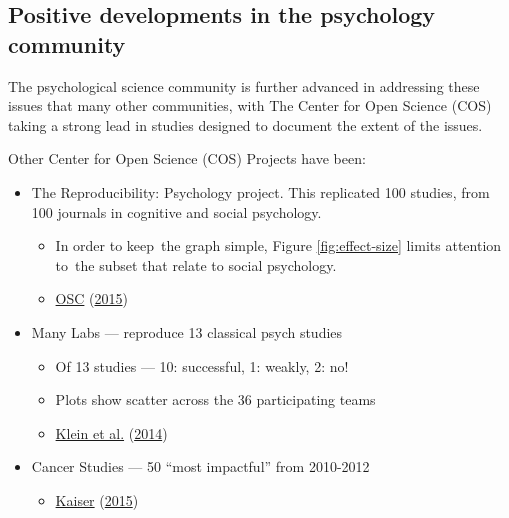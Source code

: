 \documentclass[
  10pt,
  b5paper]{book}
\providecommand{\tightlist}{%
  \setlength{\itemsep}{0pt}\setlength{\parskip}{0pt}}
\begin{document}
\hypertarget{positive-developments-in-the-psychology-community}{%
\subsection*{Positive developments in the psychology community}\label{positive-developments-in-the-psychology-community}}

The psychological science community is further advanced in
addressing these issues that many other communities, with
The Center for Open Science (COS) taking a strong lead in
studies designed to document the extent of the issues.

Other Center for Open Science (COS) Projects have been:

\begin{itemize}
\tightlist
\item
  The Reproducibility: Psychology project. This replicated
  100 studies, from 100 journals in cognitive and social
  psychology.

  \begin{itemize}
  \tightlist
  \item
    In order to keep~the graph simple, Figure
    \ref{fig:effect-size} limits attention to~the
    subset that relate to social psychology.
  \item
    \protect\hyperlink{ref-osc_EstRep2015}{OSC} (\protect\hyperlink{ref-osc_EstRep2015}{2015})
  \end{itemize}
\item
  Many Labs --- reproduce 13 classical psych studies

  \begin{itemize}
  \tightlist
  \item
    Of 13 studies --- 10: successful, 1: weakly, 2: no!
  \item
    Plots show scatter across the 36 participating teams
  \item
    \protect\hyperlink{ref-r7_klein_others_2014}{Klein et al.} (\protect\hyperlink{ref-r7_klein_others_2014}{2014})
  \end{itemize}
\item
  Cancer Studies --- 50 ``most impactful'' from 2010-2012

  \begin{itemize}
  \tightlist
  \item
    \protect\hyperlink{ref-r5_kaiser_2015}{Kaiser} (\protect\hyperlink{ref-r5_kaiser_2015}{2015})
  \end{itemize}
\end{itemize}
\end{document}
